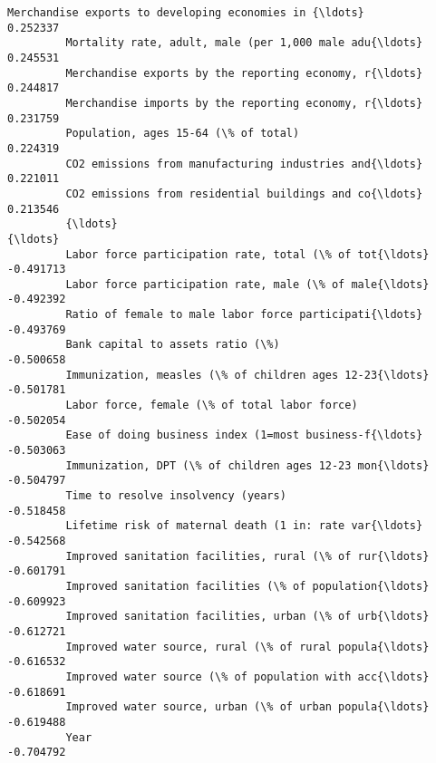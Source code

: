 \documentclass[11pt]{article}
\begin{document}
\begin{Verbatim}[commandchars=\\\{\}]
         Merchandise exports to developing economies in {\ldots}                                  0.252337
         Mortality rate, adult, male (per 1,000 male adu{\ldots}                                  0.245531
         Merchandise exports by the reporting economy, r{\ldots}                                  0.244817
         Merchandise imports by the reporting economy, r{\ldots}                                  0.231759
         Population, ages 15-64 (\% of total)                                                 0.224319
         CO2 emissions from manufacturing industries and{\ldots}                                  0.221011
         CO2 emissions from residential buildings and co{\ldots}                                  0.213546
         {\ldots}                                                                                      {\ldots}
         Labor force participation rate, total (\% of tot{\ldots}                                 -0.491713
         Labor force participation rate, male (\% of male{\ldots}                                 -0.492392
         Ratio of female to male labor force participati{\ldots}                                 -0.493769
         Bank capital to assets ratio (\%)                                                   -0.500658
         Immunization, measles (\% of children ages 12-23{\ldots}                                 -0.501781
         Labor force, female (\% of total labor force)                                       -0.502054
         Ease of doing business index (1=most business-f{\ldots}                                 -0.503063
         Immunization, DPT (\% of children ages 12-23 mon{\ldots}                                 -0.504797
         Time to resolve insolvency (years)                                                 -0.518458
         Lifetime risk of maternal death (1 in: rate var{\ldots}                                 -0.542568
         Improved sanitation facilities, rural (\% of rur{\ldots}                                 -0.601791
         Improved sanitation facilities (\% of population{\ldots}                                 -0.609923
         Improved sanitation facilities, urban (\% of urb{\ldots}                                 -0.612721
         Improved water source, rural (\% of rural popula{\ldots}                                 -0.616532
         Improved water source (\% of population with acc{\ldots}                                 -0.618691
         Improved water source, urban (\% of urban popula{\ldots}                                 -0.619488
         Year                                                                               -0.704792

\end{Verbatim}
\end{document}
